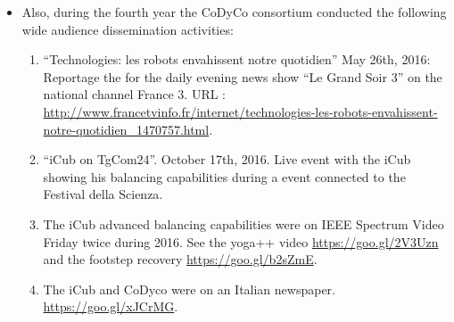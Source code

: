 \begin{itemize}
\begin{enumerate}
 \item Olivier Sigaud, ``From Machine Learning to Deep Learning with a focus on regression and RL''.
 January 24th, 2017: invited seminar at the ONERA internal workshop on machine learning and deep learning

 \item Vincent Padois: ``Vous avez dit robot? Au del\`a du mythe, la r\'ealit\'e...''
 March 22nd, 2016: invited seminar at the CE Industriel d’Air France.
 
 \item Vincent Padois (plenary talk), ``Collaborative robotics : from workspace sharing to physical interactions''
 August 31st, 2016. Plenary talk at the 21th International Conference on Methods and Models in Automation and Robotics.
 
 \end{enumerate}
  
 \item Also, during the fourth year the CoDyCo consortium conducted the following 
 wide audience dissemination activities:
 
 \begin{enumerate}
 \item ``Technologies: les robots envahissent notre quotidien''
 May 26th, 2016: Reportage the for the daily evening news show ``Le Grand Soir 3'' on the national channel France 3. URL : \url{http://www.francetvinfo.fr/internet/technologies-les-robots-envahissent-notre-quotidien_1470757.html}.
 
 \item ``iCub on TgCom24''. October 17th, 2016. Live event with the iCub showing his balancing capabilities during
 a event connected to the Festival della Scienza.
 
 \item The iCub advanced balancing capabilities were on IEEE Spectrum Video Friday twice during 2016. 
 See the yoga++ video  
\url{https://goo.gl/2V3Uzn} and the footstep recovery  \url{https://goo.gl/b2sZmE}.

\item The iCub and CoDyco were on an Italian newspaper. \url{https://goo.gl/xJCrMG}.

 \end{enumerate}
 
\end{itemize}

